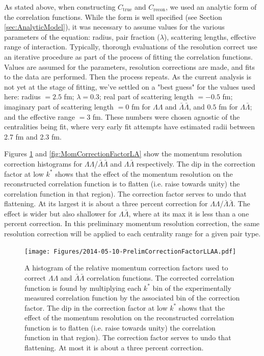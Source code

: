 As stated above, when constructing $C_\mathrm{true}$ and $C_\mathrm{recon}$, we used an analytic form of the correlation functions.  
While the form is well specified (see Section \ref{sec:AnalyticModel}), it was necessary to assume values for the various parameters of the equation: radius, pair fraction ($\lambda$), scattering lengths, effective range of interaction.  
Typically, thorough evaluations of the resolution correct use an iterative procedure as part of the process of fitting the correlation functions.  
Values are assumed for the parameters, resolution corrections are made, and fits to the data are performed.  
Then the process repeats.  
As the current analysis is not yet at the stage of fitting, we've settled on a "best guess" for the values used here: radius $=2.5$ fm; $\lambda = 0.3$; real part of scattering length $= -0.5$ fm; imaginary part of scattering length $= 0$ fm for $\Lambda\Lambda$ and $\bar{\Lambda}\bar{\Lambda}$, and $0.5$ fm for $\Lambda\bar{\Lambda}$; and the effective range $=3$ fm.  
These numbers were chosen agnostic of the centralities being fit, where very early fit attempts have estimated radii between 2.7 fm and 2.3 fm.  

Figures \ref{fig:MomCorrectionFactorLLAA} and \ref{fig:MomCorrectionFactorLA} show the momentum resolution correction histograms for $\Lambda\Lambda$/$\bar{\Lambda}\bar{\Lambda}$ and $\Lambda\bar{\Lambda}$ respectively.  
The dip in the correction factor at low $k^*$ shows that the effect of the momentum resolution on the reconstructed correlation function is to flatten (i.e. raise towards unity) the correlation function in that region).  
The correction factor serves to undo that flattening.  
At its largest it is about a three percent correction for $\Lambda\Lambda$/$\bar{\Lambda}\bar{\Lambda}$.  
The effect is wider but also shallower for $\Lambda\bar{\Lambda}$, where at its max it is less than a one percent correction.  
In this preliminary momentum resolution correction, the same resolution correction will be applied to each centrality range for a given pair type.  

\begin{figure}
\texttt{[image: Figures/2014-05-10-PrelimCorrectionFactorLLAA.pdf]}
\caption[Relative momentum correction factor for $\Lambda\Lambda$ and $\bar{\Lambda}\bar{\Lambda}$]{A histogram of the relative momentum correction factors used to correct $\Lambda\Lambda$ and $\bar{\Lambda}\bar{\Lambda}$ correlation functions.  
The corrected correlation function is found by multiplying each $k^*$ bin of the experimentally measured correlation function by the associated bin of the correction factor.  
The dip in the correction factor at low $k^*$ shows that the effect of the momentum resolution on the reconstructed correlation function is to flatten (i.e. raise towards unity) the correlation function in that region).  
The correction factor serves to undo that flattening.  
At most it is about a three percent correction.}
\label{fig:MomCorrectionFactorLLAA}
\end{figure}

